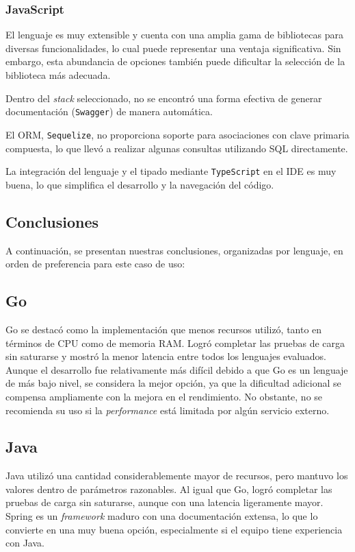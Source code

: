 \documentclass[11pt]{article}
\let\Oldsubsection\subsection
\renewcommand{\subsection}{\FloatBarrier\Oldsubsection}
\let\Oldsubsubsection\subsubsection
\renewcommand{\subsubsection}{\FloatBarrier\Oldsubsubsection}
\newcommand{\english}[1]{\textit{#1}}
\begin{document}
\subsubsection{JavaScript}

El lenguaje es muy extensible y cuenta con una amplia gama de bibliotecas para diversas funcionalidades, lo cual puede representar una ventaja significativa. Sin embargo, esta abundancia de opciones también puede dificultar la selección de la biblioteca más adecuada.

Dentro del \english{stack} seleccionado, no se encontró una forma efectiva de generar documentación (\lstinline{Swagger}) de manera automática.

El ORM, \lstinline{Sequelize}, no proporciona soporte para asociaciones con clave primaria compuesta, lo que llevó a realizar algunas consultas utilizando SQL directamente.

La integración del lenguaje y el tipado mediante \lstinline{TypeScript} en el IDE es muy buena, lo que simplifica el desarrollo y la navegación del código.


\subsection{Conclusiones}

A continuación, se presentan nuestras conclusiones, organizadas por lenguaje, en orden de preferencia para este caso de uso:

\subsection{Go}
Go se destacó como la implementación que menos recursos utilizó, tanto en términos de CPU como de memoria RAM. Logró completar las pruebas de carga sin saturarse y mostró la menor latencia entre todos los lenguajes evaluados. Aunque el desarrollo fue relativamente más difícil debido a que Go es un lenguaje de más bajo nivel, se considera la mejor opción, ya que la dificultad adicional se compensa ampliamente con la mejora en el rendimiento. No obstante, no se recomienda su uso si la \english{performance} está limitada por algún servicio externo.

\subsection{Java}
Java utilizó una cantidad considerablemente mayor de recursos, pero mantuvo los valores dentro de parámetros razonables. Al igual que Go, logró completar las pruebas de carga sin saturarse, aunque con una latencia ligeramente mayor. Spring es un \textit{framework} maduro con una documentación extensa, lo que lo convierte en una muy buena opción, especialmente si el equipo tiene experiencia con Java.
\end{document}
